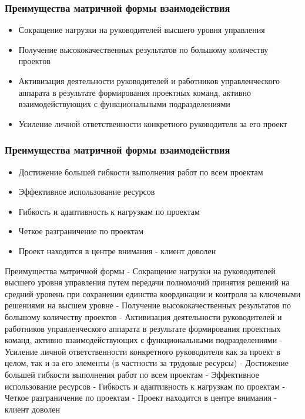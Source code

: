 \documentclass{../industrial-development}
\begin{document}
\begin{frame} \frametitle{Преимущества матричной формы взаимодействия}
  
  \begin{itemize}
  \item Сокращение нагрузки на руководителей высшего уровня управления 
  \item Получение высококачественных результатов по большому количеству проектов
  \item Активизация деятельности руководителей и работников управленческого аппарата в результате формирования проектных команд, активно взаимодействующих с функциональными подразделениями
  \item Усиление личной ответственности конкретного руководителя за его проект
  \end{itemize}
\end{frame}

\begin{frame} \frametitle{Преимущества матричной формы взаимодействия}
  
  \begin{itemize}
 \item Достижение большей гибкости выполнения работ по всем проектам
 \item Эффективное использование ресурсов
 \item Гибкость и адаптивность к нагрузкам по проектам
 \item Четкое разграничение по проектам
 \item Проект находится в центре внимания - клиент доволен
  \end{itemize}
\end{frame}

\lecturenotes
Преимущества матричной формы
- Сокращение нагрузки на руководителей высшего уровня управления путем передачи полномочий принятия решений на средний уровень при сохранении единства координации и контроля за ключевыми решениями на высшем уровне
- Получение высококачественных результатов по большому количеству проектов
- Активизация деятельности руководителей и работников управленческого аппарата в результате формирования проектных команд, активно взаимодействующих с функциональными подразделениями
- Усиление личной ответственности конкретного руководителя как за проект в целом, так и за его элементы (в частности за трудовые ресурсы)
- Достижение большей гибкости выполнения работ по всем проектам
- Эффективное использование ресурсов
- Гибкость и адаптивность к нагрузкам по проектам
- Четкое разграничение по проектам
- Проект находится в центре внимания - клиент доволен
\end{document}
